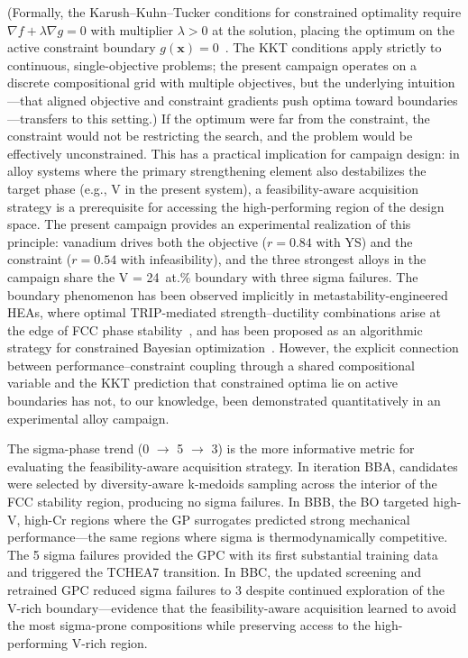 \documentclass[preprint,12pt,times]{elsarticle}  %
\begin{document}
(Formally, the Karush--Kuhn--Tucker conditions for constrained optimality require $\nabla f + \lambda \nabla g = 0$ with multiplier $\lambda > 0$ at the solution, placing the optimum on the active constraint boundary $g(\mathbf{x}) = 0$~\cite{nocedal2006numerical}. The KKT conditions apply strictly to continuous, single-objective problems; the present campaign operates on a discrete compositional grid with multiple objectives, but the underlying intuition---that aligned objective and constraint gradients push optima toward boundaries---transfers to this setting.) If the optimum were far from the constraint, the constraint would not be restricting the search, and the problem would be effectively unconstrained. This has a practical implication for campaign design: in alloy systems where the primary strengthening element also destabilizes the target phase (e.g., V in the present system), a feasibility-aware acquisition strategy is a prerequisite for accessing the high-performing region of the design space. The present campaign provides an experimental realization of this principle: vanadium drives both the objective ($r = 0.84$ with YS) and the constraint ($r = 0.54$ with infeasibility), and the three strongest alloys in the campaign share the V = 24~at.\% boundary with three sigma failures. The boundary phenomenon has been observed implicitly in metastability-engineered HEAs, where optimal TRIP-mediated strength--ductility combinations arise at the edge of FCC phase stability~\cite{li2016metastable}, and has been proposed as an algorithmic strategy for constrained Bayesian optimization~\cite{tian2024boundary, maguire2025good}. However, the explicit connection between performance--constraint coupling through a shared compositional variable and the KKT prediction that constrained optima lie on active boundaries has not, to our knowledge, been demonstrated quantitatively in an experimental alloy campaign.

The sigma-phase trend (0 $\rightarrow$ 5 $\rightarrow$ 3) is the more informative metric for evaluating the feasibility-aware acquisition strategy. In iteration BBA, candidates were selected by diversity-aware k-medoids sampling across the interior of the FCC stability region, producing no sigma failures. In BBB, the BO targeted high-V, high-Cr regions where the GP surrogates predicted strong mechanical performance---the same regions where sigma is thermodynamically competitive. The 5 sigma failures provided the GPC with its first substantial training data and triggered the TCHEA7 transition. In BBC, the updated screening and retrained GPC reduced sigma failures to 3 despite continued exploration of the V-rich boundary---evidence that the feasibility-aware acquisition learned to avoid the most sigma-prone compositions while preserving access to the high-performing V-rich region.
\end{document}
